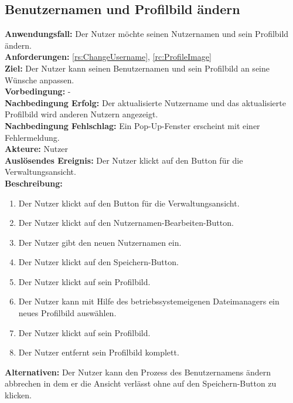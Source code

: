 \documentclass[parskip=full]{scrartcl}
\begin{document}
\subsection{Benutzernamen und Profilbild ändern}
\textbf{Anwendungsfall:} Der Nutzer möchte seinen Nutzernamen und sein Profilbild ändern.\\
\textbf{Anforderungen:} \ref{rs:ChangeUsername}, \ref{rc:ProfileImage}\\
\textbf{Ziel:} Der Nutzer kann seinen Benutzernamen und sein Profilbild an seine Wünsche anpassen.\\
\textbf{Vorbedingung:} -\\
\textbf{Nachbedingung Erfolg:} Der aktualisierte Nutzername und das aktualisierte Profilbild wird anderen Nutzern angezeigt.\\
\textbf{Nachbedingung Fehlschlag:} Ein Pop-Up-Fenster erscheint mit einer Fehlermeldung.\\
\textbf{Akteure:} Nutzer\\
\textbf{Auslösendes Ereignis:} Der Nutzer klickt auf den Button für die Verwaltungsansicht.\\
\textbf{Beschreibung:}
\begin{enumerate}
    \item Der Nutzer klickt auf den Button für die Verwaltungsansicht.
    \item Der Nutzer klickt auf den Nutzernamen-Bearbeiten-Button.
    \item Der Nutzer gibt den neuen Nutzernamen ein.
    \item Der Nutzer klickt auf den Speichern-Button.
    \item Der Nutzer klickt auf sein Profilbild.
    \item Der Nutzer kann mit Hilfe des betriebssystemeigenen Dateimanagers ein neues Profilbild auswählen.
    \item Der Nutzer klickt auf sein Profilbild.
    \item Der Nutzer entfernt sein Profilbild komplett.
\end{enumerate}
\textbf{Alternativen:} Der Nutzer kann den Prozess des Benutzernamens ändern abbrechen in dem er die Ansicht verlässt ohne auf den Speichern-Button zu klicken.
\newpage
\end{document}
